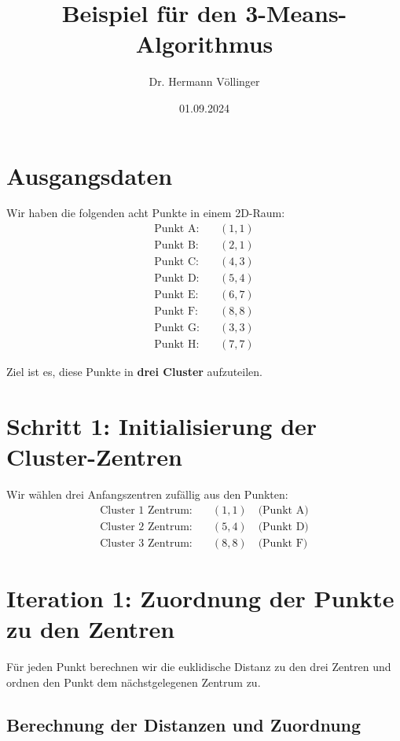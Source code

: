 \documentclass{article}
\begin{document}
\title{Beispiel für den 3-Means-Algorithmus}
\author{Dr. Hermann Völlinger}
\date{01.09.2024}
\maketitle 

\section*{Ausgangsdaten}
Wir haben die folgenden acht Punkte in einem 2D-Raum:
\begin{align*}
\text{Punkt A:} & \quad (1, 1) \\
\text{Punkt B:} & \quad (2, 1) \\
\text{Punkt C:} & \quad (4, 3) \\
\text{Punkt D:} & \quad (5, 4) \\
\text{Punkt E:} & \quad (6, 7) \\
\text{Punkt F:} & \quad (8, 8) \\
\text{Punkt G:} & \quad (3, 3) \\
\text{Punkt H:} & \quad (7, 7)
\end{align*}

Ziel ist es, diese Punkte in \textbf{drei Cluster} aufzuteilen.

\section*{Schritt 1: Initialisierung der Cluster-Zentren}
Wir wählen drei Anfangszentren zufällig aus den Punkten:
\begin{align*}
\text{Cluster 1 Zentrum:} & \quad (1, 1) \quad \text{(Punkt A)} \\
\text{Cluster 2 Zentrum:} & \quad (5, 4) \quad \text{(Punkt D)} \\
\text{Cluster 3 Zentrum:} & \quad (8, 8) \quad \text{(Punkt F)}
\end{align*}

\section*{Iteration 1: Zuordnung der Punkte zu den Zentren}
Für jeden Punkt berechnen wir die euklidische Distanz zu den drei Zentren und ordnen den Punkt dem nächstgelegenen Zentrum zu.

\subsection*{Berechnung der Distanzen und Zuordnung}
\end{document}
